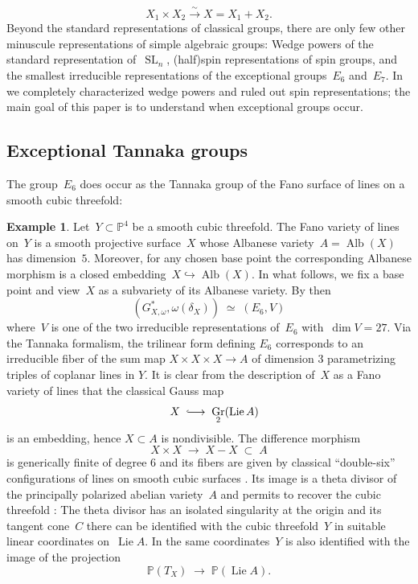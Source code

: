 \documentclass[a4paper]{amsart}
\newcommand{\bbP}{\mathbb{P}}
\newcommand{\too}{\longrightarrow}
\newcommand{\iso}{\simeq}
\newcommand{\intoo}{\lhook\joinrel\longrightarrow}
\DeclareMathOperator{\Alb}{Alb}
\DeclareMathOperator{\Gr}{Gr}
\DeclareMathOperator{\SL}{SL}
\DeclareMathOperator{\Lie}{Lie}
\theoremstyle{plain}
\theoremstyle{definition}
\newtheorem*{exampleintro}{Example}
\numberwithin{equation}{section}
\begin{document}
\[ X_1 \times X_2 \stackrel{\sim}{\too} X = X_1 + X_2.\]
Beyond the standard representations of classical groups, there are only few other minuscule representations of simple algebraic groups: Wedge powers of the standard representation of~$\SL_n$, (half)spin representations of spin groups, and the smallest irreducible representations of the exceptional groups~$E_6$ and~$E_7$. In \cite{JKLM} we completely characterized wedge powers and ruled out spin representations; the main goal of this paper is to understand when exceptional groups occur.

\subsection{Exceptional Tannaka groups} 

The group~$E_6$ does occur as the Tannaka group of the Fano surface of lines on a smooth cubic threefold:

\begin{exampleintro} \label{Ex:CubicThreefoldE6} 
Let~$Y \subset \bbP^4$ be a smooth cubic threefold. The Fano variety of lines on~$Y$ is a smooth projective surface~$X$ whose Albanese variety~$A=\Alb(X)$ has dimension~$5$. Moreover, for any chosen base point the corresponding Albanese morphism is a closed embedding~$X \hookrightarrow \Alb(X)$. In what follows, we fix a base point and view~$X$ as a subvariety of its Albanese variety. By \cite[th.~2]{KraemerCubicThreefolds} then
%
\[ (G^\ast_{X,\omega}, \omega(\delta_X)) \; \iso \; (E_6, V) \]
%
where~$V$ is one of the two irreducible representations of~$E_6$ with~$\dim V = 27$. Via the Tannaka formalism, the trilinear form defining $E_6$ corresponds to an irreducible fiber of the sum map $X \times X \times X \to A$  of dimension $3$ parametrizing triples of coplanar lines in $Y$. It is clear from the description of~$X$ as a Fano variety of lines that the classical Gauss map
%
\[
\quad X \;\intoo\; \Gr_2(\Lie A)
\]
%
is an embedding, hence $X\subset A$ is nondivisible. The difference morphism
\[
 X\times X \;\longrightarrow\; X - X \;\subset\; A
\]
is generically finite of degree $6$ and its fibers are given by classical ``double-six'' configurations of lines on smooth cubic surfaces \cite[sect. 13]{ClemensGriffiths}. Its image is a theta divisor of the principally polarized abelian variety~$A$ and permits to recover the cubic threefold \cite[th.~13.4]{ClemensGriffiths} \cite{BeauvilleIntermediateJacobian}: The theta divisor has an isolated singularity at the origin and its tangent cone~$C$ there can be identified with the cubic threefold~$Y$ in suitable linear coordinates on~$\Lie A$. In the same coordinates~$Y$ is also identified with the image of the projection
%
\[ \bbP(T_X) \; \too \; \bbP(\Lie A).\]
% 
\end{exampleintro}
\end{document}
